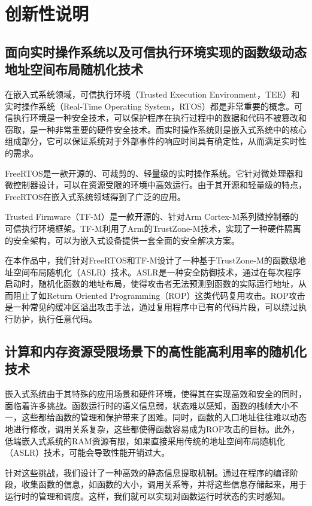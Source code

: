 \documentclass[UTF8,12pt,a4paper]{ctexart}
\numberwithin{figure}{section}
\begin{document}
\section{创新性说明}
\subsection{面向实时操作系统以及可信执行环境实现的函数级动态地址空间布局随机化技术}
\par 在嵌入式系统领域，可信执行环境（Trusted Execution Environment，TEE）和实时操作系统（Real-Time Operating System，RTOS）都是非常重要的概念。可信执行环境是一种安全技术，可以保护程序在执行过程中的数据和代码不被篡改和窃取，是一种非常重要的硬件安全技术。而实时操作系统则是嵌入式系统中的核心组成部分，它可以保证系统对于外部事件的响应时间具有确定性，从而满足实时性的需求。

\par FreeRTOS是一款开源的、可裁剪的、轻量级的实时操作系统。它针对微处理器和微控制器设计，可以在资源受限的环境中高效运行。由于其开源和轻量级的特点，FreeRTOS在嵌入式系统领域得到了广泛的应用。

\par Trusted Firmware（TF-M）是一款开源的、针对Arm Cortex-M系列微控制器的可信执行环境框架。TF-M利用了Arm的TrustZone-M技术，实现了一种硬件隔离的安全架构，可以为嵌入式设备提供一套全面的安全解决方案。

\par 在本作品中，我们针对FreeRTOS和TF-M设计了一种基于TrustZone-M的函数级地址空间布局随机化（ASLR）技术。ASLR是一种安全防御技术，通过在每次程序启动时，随机化函数的地址布局，使得攻击者无法预测到函数的实际运行地址，从而阻止了如Return Oriented Programming（ROP）这类代码复用攻击。ROP攻击是一种常见的缓冲区溢出攻击手法，通过复用程序中已有的代码片段，可以绕过执行防护，执行任意代码。

\subsection{计算和内存资源受限场景下的高性能高利用率的随机化技术}
\par 嵌入式系统由于其特殊的应用场景和硬件环境，使得其在实现高效和安全的同时，面临着许多挑战。函数运行时的语义信息弱，状态难以感知，函数的栈帧大小不一，这些都给函数的管理和保护带来了困难。同时，函数的入口地址往往难以动态地进行修改，调用关系复杂，这些都使得函数容易成为ROP攻击的目标。此外，低端嵌入式系统的RAM资源有限，如果直接采用传统的地址空间布局随机化（ASLR）技术，可能会导致性能开销过大。

\par 针对这些挑战，我们设计了一种高效的静态信息提取机制。通过在程序的编译阶段，收集函数的信息，如函数的大小，调用关系等，并将这些信息存储起来，用于运行时的管理和调度。这样，我们就可以实现对函数运行时状态的实时感知。
\end{document}
